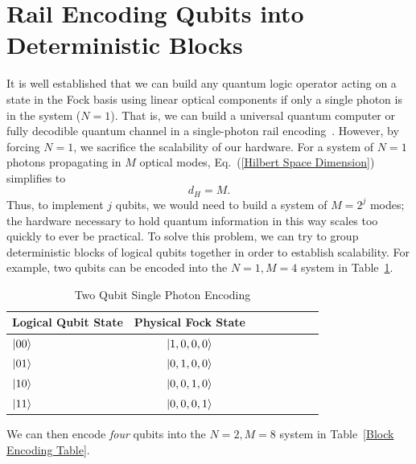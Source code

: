 \documentclass[aps,pra,twocolumn,showpacs,superscriptaddress,floatfix,10pt]{revtex4}
\begin{document}
\section{Rail Encoding Qubits into Deterministic Blocks}
\label{Section Block Encoding}
It is well established that we can build any quantum logic operator acting on a state in the Fock basis using linear optical components if only a single photon is in the system ($N=1$). That is, we can build a universal quantum computer or fully decodible quantum channel in a single-photon rail encoding~\cite{Adami,Review Paper}. However, by forcing $N=1$, we sacrifice the scalability of our hardware. For a system of $N=1$ photons propagating in $M$ optical modes, Eq.~(\ref{Hilbert Space Dimension}) simplifies to
\begin{equation}
d_H = M.
\end{equation}
Thus, to implement $j$ qubits, we would need to build a system of $M=2^j$ modes; the hardware necessary to hold quantum information in this way scales too quickly to ever be practical. To solve this problem, we can try to group deterministic blocks of logical qubits together in order to establish scalability. For example, two qubits can be encoded into the $N=1,M=4$ system in Table~\ref{Two Qubit Encoding Table}.
\begin {table}[h]
\begin{center}
	\begin{tabular}{l*{6}{c}r} 
		Logical Qubit State      \quad \quad \quad     & Physical Fock State \\
		\hline 
		\quad \quad \quad $\ket{00}$     & $\ket{1,0,0,0}$ \\
		\quad \quad \quad $\ket{01}$            & $\ket{0,1,0,0}$ \\
		\quad \quad \quad $\ket{10}$            & $\ket{0,0,1,0}$ \\
		\quad \quad \quad $\ket{11}$            & $\ket{0,0,0,1}$ \\
	\end{tabular}
	\caption{ \label{Two Qubit Encoding Table} Two Qubit Single Photon Encoding}
\end{center}
\end{table}
We can then encode \textit{four} qubits into the $N=2,M=8$ system in Table~\ref{Block Encoding Table}.
\end{document}
